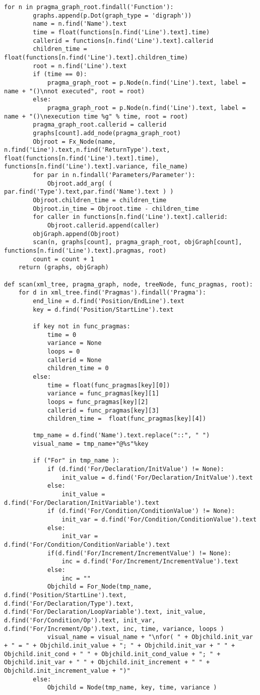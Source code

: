 \documentclass[a4paper,10pt,twoside]{book}
\begin{document}
\begin{lstlisting}[language=CCC, caption=pargraph.py]
	for n in pragma_graph_root.findall('Function'):
		graphs.append(p.Dot(graph_type = 'digraph'))
		name = n.find('Name').text
		time = float(functions[n.find('Line').text].time)
		callerid = functions[n.find('Line').text].callerid
		children_time = float(functions[n.find('Line').text].children_time)
		root = n.find('Line').text
		if (time == 0):
			pragma_graph_root = p.Node(n.find('Line').text, label = name + "()\nnot executed", root = root)
		else:
			pragma_graph_root = p.Node(n.find('Line').text, label = name + "()\nexecution time %g" % time, root = root)
		pragma_graph_root.callerid = callerid
		graphs[count].add_node(pragma_graph_root)
		Objroot = Fx_Node(name, n.find('Line').text,n.find('ReturnType').text, float(functions[n.find('Line').text].time), functions[n.find('Line').text].variance, file_name)
		for par in n.findall('Parameters/Parameter'):
			Objroot.add_arg( ( par.find('Type').text,par.find('Name').text ) )
		Objroot.children_time = children_time
		Objroot.in_time = Objroot.time - children_time
		for caller in functions[n.find('Line').text].callerid:
			Objroot.callerid.append(caller)
		objGraph.append(Objroot)
		scan(n, graphs[count], pragma_graph_root, objGraph[count], functions[n.find('Line').text].pragmas, root)
		count = count + 1
	return (graphs, objGraph)

def scan(xml_tree, pragma_graph, node, treeNode, func_pragmas, root):
	for d in xml_tree.find('Pragmas').findall('Pragma'):
		end_line = d.find('Position/EndLine').text
		key = d.find('Position/StartLine').text

		if key not in func_pragmas:
			time = 0
			variance = None
			loops = 0
			callerid = None
			children_time = 0
		else:
			time = float(func_pragmas[key][0])
			variance = func_pragmas[key][1]
			loops = func_pragmas[key][2]
			callerid = func_pragmas[key][3]
			children_time =  float(func_pragmas[key][4])

		tmp_name = d.find('Name').text.replace("::", " ")
		visual_name = tmp_name+"@%s"%key

		if ("For" in tmp_name ):
			if (d.find('For/Declaration/InitValue') != None):
				init_value = d.find('For/Declaration/InitValue').text
			else:
				init_value = d.find('For/Declaration/InitVariable').text
			if (d.find('For/Condition/ConditionValue') != None):
				init_var = d.find('For/Condition/ConditionValue').text
			else:
				init_var = d.find('For/Condition/ConditionVariable').text
			if(d.find('For/Increment/IncrementValue') != None):
				inc = d.find('For/Increment/IncrementValue').text
			else:
				inc = ""
			Objchild = For_Node(tmp_name, d.find('Position/StartLine').text, d.find('For/Declaration/Type').text, d.find('For/Declaration/LoopVariable').text, init_value, d.find('For/Condition/Op').text, init_var, d.find('For/Increment/Op').text, inc, time, variance, loops )
			visual_name = visual_name + "\nfor( " + Objchild.init_var + " = " + Objchild.init_value + "; " + Objchild.init_var + " " + Objchild.init_cond + " " + Objchild.init_cond_value + "; " + Objchild.init_var + " " + Objchild.init_increment + " " + Objchild.init_increment_value + ")"
		else:
			Objchild = Node(tmp_name, key, time, variance )


\end{lstlisting}
\end{document}
